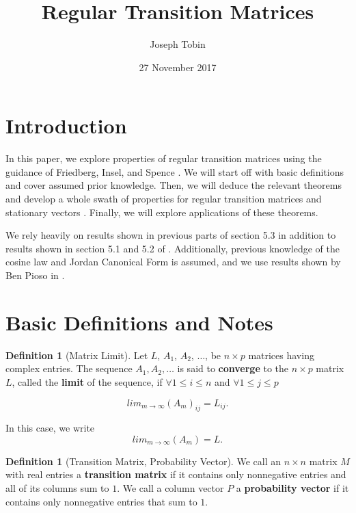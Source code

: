 \documentclass{amsart}
\title{Regular Transition Matrices}
\author{Joseph Tobin}
\date{27 November 2017}
\theoremstyle{definition}
\newtheorem{definition}[thm]{Definition}
\theoremstyle{remark}
\numberwithin{equation}{section}
\begin{document}
\maketitle





\section{Introduction}
In this paper, we explore properties of regular transition matrices
using the guidance of Friedberg, Insel, and Spence
\cite{friedberg2003linear}. We will start off with basic definitions
and cover assumed prior knowledge. Then, we will deduce the relevant
theorems and develop a whole swath of properties for regular
transition matrices and stationary vectors . Finally, we will
explore applications of these theorems.


We rely heavily on results shown in previous parts of section 5.3 in
addition to results shown in section 5.1 and 5.2 of
\cite{friedberg2003linear}. Additionally, previous knowledge of the
cosine law and Jordan Canonical Form is assumed, and we use results
shown by Ben Pioso in \cite{benspaper}.

\section{Basic Definitions and Notes}

\begin{definition}[Matrix Limit]
Let $L$, $A_1$, $A_2$, $\ldots$, be $n \times p$ matrices having complex entries.
The sequence $A_1, A_2, \ldots$ is said to \textbf{converge} to the $n \times p$ matrix $L$,
called the \textbf{limit} of the sequence, if $\forall 1 \leq i \leq n$ and $\forall 1 \leq j \leq p$

$$lim_{m \to \infty}(A_m)_{ij} = L_{ij}.$$

In this case, we write $$ lim_{m \to \infty}(A_m) = L.$$


\end{definition}


\begin{definition}[Transition Matrix, Probability Vector]
We call an $n \times n$ matrix $M$ with real entries a
\textbf{transition matrix} if it contains only nonnegative entries
and all of its columns sum to $1$. We call a column vector $P$ a
\textbf{probability vector} if it contains only nonnegative entries
that sum to $1$.
\end{definition}
\end{document}
